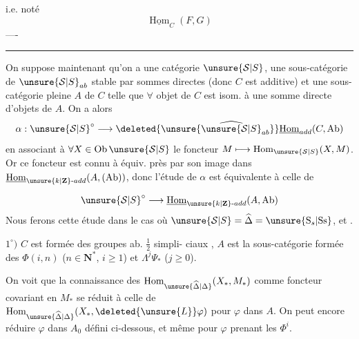 i.e.
noté
\[
\underline{\operatorname{Hom}}_C(F,G)
\]
----
\par\bigskip\hrule\bigskip
On suppose maintenant qu'on a
une catégorie $\unsure{\mathcal{S}|S}$, une sous-catégorie
 de $\unsure{\mathcal{S}|S}_{ab}$ stable par sommes directes
(donc $C$ est additive) et une
sous-catégorie pleine $A$ de $C$ telle
que $\forall$ objet de $C$ est isom. à une
somme directe  d'objets de $A$.
On a alors 
\[
\alpha:\unsure{\mathcal{S}|S}^\circ\longrightarrow\deleted{\unsure{\widehat{\unsure{\mathcal{S}|S}}_{ab}}}
\underline{\operatorname{Hom}}_{add}(C,\mathrm{Ab})
\]
en associant à $\forall X\in\operatorname{Ob}\unsure{\mathcal{S}|S}$
le foncteur $M\longmapsto\operatorname{Hom}_{\unsure{\mathcal{S}|S}}(X,M)$.
Or ce foncteur est connu à équiv.
près par  son image
dans $\underline{\operatorname{Hom}}_{\unsure{k|\mathbf Z}\text{-}add}(A,(\mathrm{Ab}))$, donc l'étude
de $\alpha$ est équivalente à celle de

\[
\unsure{\mathcal{S}|S}^\circ\longrightarrow\underline{\operatorname{Hom}}_{\unsure{k|\mathbf Z}\text{-}add}(A,\mathrm{Ab})
\]
Nous ferons cette étude dans le
cas où $\unsure{\mathcal{S}|S}=\widehat\Delta=\unsure{\mathrm{S}_s|\mathrm{Ss}}$, et 
\uline{}.

$1^\circ)$ $C$ est formée des groupes ab. $\frac12$ simpli-
ciaux , $A$ est la
sous-catégorie formée des
$\Phi(i,n)$ ($n\in\mathbf N^*$,  $i\geqslant1$) et $\Lambda^j\Psi_*$ ($j\geqslant0$).

On voit que  la connaissance des
$\operatorname{Hom}_{\unsure{\widehat\Delta|\Delta}}(X_*,M_*)$ comme foncteur
covariant en $M_*$ se réduit à
celle de $\operatorname{Hom}_{\unsure{\widehat\Delta|\Delta}}(X_*,\deleted{\unsure{L}}\varphi)$ pour
$\varphi$ dans $A$. On peut encore
réduire  $\varphi$ dans $A_0$ défini
ci-dessous, et même pour $\varphi$ prenant
les $\Phi^i$.

